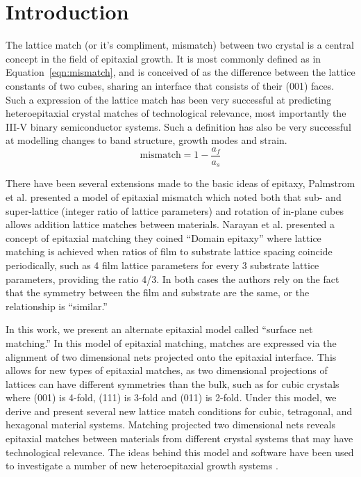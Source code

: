 \documentclass[final,5p,times,twocolumn]{elsarticle}
\begin{document}
\section{Introduction}
\label{Introduction}
The lattice match (or it’s compliment, mismatch) between two crystal is a central concept in the field of epitaxial growth. It is most commonly defined as in Equation~\ref{eqn:mismatch}, and is conceived of as the difference between the lattice constants of two cubes, sharing an interface that consists of their (001) faces. Such a expression of the lattice match has been very successful at predicting heteroepitaxial crystal matches of technological relevance, most importantly the III-V binary semiconductor systems. Such a definition has also be very successful at modelling changes to band structure\cite{Chuang1991}, growth modes\cite{Dunstan1997} and strain\cite{Dunstan1997}.
\begin{equation}
\text{mismatch} = 1 - \frac{a_f}{a_s} \label{eqn:mismatch}
\end{equation}

There have been several extensions made to the basic ideas of epitaxy, Palmstrom et al. \cite{Palmstrom1995} presented a model of epitaxial mismatch which noted both that sub- and super-lattice (integer ratio of lattice parameters) and rotation of in-plane cubes allows addition lattice matches between materials. Narayan et al. \cite{Narayan2003} presented a concept of epitaxial matching they coined “Domain epitaxy” where lattice matching is achieved when ratios of film to substrate lattice spacing coincide periodically, such as 4 film lattice parameters for every 3 substrate lattice parameters, providing the ratio 4/3. In both cases the authors rely on the fact that the symmetry between the film and substrate are the same, or the relationship is “similar.”

In this work, we present an alternate epitaxial model called ``surface net matching.'' In this model of epitaxial matching, matches are expressed via the alignment of two dimensional nets projected onto the epitaxial interface. This allows for new types of epitaxial matches, as two dimensional projections of lattices can have different symmetries than the bulk, such as for cubic crystals where (001) is 4-fold, (111) is 3-fold and (011) is 2-fold. Under this model, we derive and present several new lattice match conditions for cubic, tetragonal, and hexagonal material systems. Matching projected two dimensional nets reveals epitaxial matches between materials from different crystal systems that may have technological relevance. The ideas behind this model and software have been used to investigate a number of new heteroepitaxial growth systems \cite{Devenyi2009,Neretina2006,Neretina2008b}.
\end{document}
